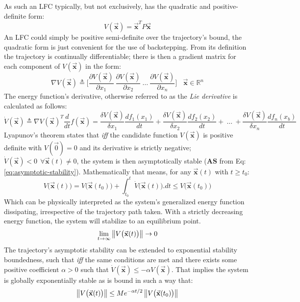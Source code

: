 As such an LFC typically, but not exclusively, has the quadratic and positive-definite form:
\begin{equation}
V(\vec{\mathbf{x}})=\vec{\mathbf{x}}^TP\vec{\mathbf{x}}
\end{equation}
An LFC could simply be positive semi-definite over the trajectory's bound, the quadratic form is just convenient for the use of backstepping. From its definition the trajectory is continually differentiable; there is then a gradient matrix for each component of $V(\vec{\mathbf{x}})$ in the form:
\begin{equation}
\nabla V(\vec{\mathbf{x}})\triangleq\bigg[\frac{\partial V(\vec{\mathbf{x}})}{\partial x_1}~\frac{\partial V(\vec{\mathbf{x}})}{\partial x_2}~\ldots~\frac{\partial V(\vec{\mathbf{x}})}{\partial x_n}\bigg]~~~~\vec{\mathbf{x}}\in\mathbb{R}^n
\end{equation}
The energy function's derivative, otherwise referred to as the \emph{Lie derivative}\cite{noteonlyapunov,nonlinearsystems} is calculated as follows:
\begin{equation}
\dot{V}(\vec{\mathbf{x}})\triangleq\nabla V(\vec{\mathbf{x}})^T\frac{d}{dt}f(\vec{\mathbf{x}})=\frac{\delta V(\vec{\mathbf{x}})}{\delta x_1}\frac{df_1(x_1)}{dt}+\frac{\delta V(\vec{\mathbf{x}})}{\delta x_2}\frac{df_2(x_2)}{dt}+~\ldots~+\frac{\delta V(\vec{\mathbf{x}})}{\delta x_n}\frac{df_n(x_b)}{dt}
\end{equation}
Lyapunov's theorem states that \emph{iff} the candidate function $V(\vec{\mathbf{x}})$ is positive definite with $V(\vec{0})=0$ and its derivative is strictly negative; $\dot{V}(\vec{\mathbf{x}})< 0~~\forall \vec{\mathbf{x}}(t) \not= 0$, the system is then asymptotically stable ($\mathbf{AS}$ from Eq:\ref{eq:asymptotic-stability}). Mathematically that means, for any $\vec{\mathbf{x}}(t)$ with $t\geq t_0$:
\begin{equation}
V\big(\vec{\mathbf{x}}(t)\big)=V\big(\vec{\mathbf{x}}(t_0)\big)+\int_{t_0}^t \dot{V}\big(\vec{\mathbf{x}}(t)\big).dt \leq V\big(\vec{\mathbf{x}}(t_0)\big)
\end{equation}
Which can be physically interpreted as the system's generalized energy function dissipating, irrespective of the trajectory path taken. With a strictly decreasing energy function, the system will stabilize to an equilibrium point. 
\begin{equation}
\lim_{t\rightarrow\infty}\left\lVert V\big(\vec{\mathbf{x}}(t)\big)\right\rVert\rightarrow 0
\end{equation}
The trajectory's asymptotic stability can be extended to exponential stability boundedness, such that \emph{iff} the same conditions are met and there exists some positive coefficient $\alpha>0$ such that $\dot{V}(\vec{\mathbf{x}})\leq-\alpha V(\vec{\mathbf{x}})$. That implies the system is globally exponentially stable as is bound in such a way that:
\begin{equation}
\left\lVert V\big(\vec{\mathbf{x}}(t)\big)\right\rVert\leq Me^{-\alpha t/2}\left\lVert V\big(\vec{\mathbf{x}}(t_0)\big)\right\rVert
\end{equation}
